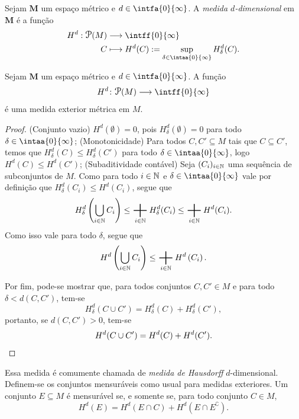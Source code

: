 \begin{defi}
Sejam $\bm M$ um espaço métrico e $d \in \intfa{0}{\infty}$. A \emph{medida $d$-dimensional} em $\bm M$ é a função
 	\begin{align*}
 	\func{H^d}{\p(M)}{\intff{0}{\infty}}{C}{H^d(C) := \sup_{\delta \in \intaa{0}{\infty}} H^d_\delta(C).}
 	\end{align*}
\end{defi}

\begin{prop}
Sejam $\bm M$ um espaço métrico e $d \in \intfa{0}{\infty}$. A função
	\begin{equation*}
	H^d\colon \p(M) \to \intff{0}{\infty}
	\end{equation*}
é uma medida exterior métrica em $M$.
\end{prop}
\begin{proof}
(Conjunto vazio) $H^d(\emptyset)=0$, pois $H^d_\delta(\emptyset)=0$ para todo $\delta \in \intaa{0}{\infty}$; (Monotonicidade) Para todos $C,C' \subseteq M$ tais que $C \subseteq C'$, temos que $H^d_\delta(C) \leq H^d_\delta(C')$ para todo $\delta \in \intaa{0}{\infty}$, logo $H^d(C) \leq H^d(C')$; (Subaditividade contável) Seja $(C_i)_{i \in \mathbb{N}}$ uma sequência de subconjuntos de $M$. Como para todo $i \in \mathbb{N}$ e $\delta \in \intaa{0}{\infty}$ vale por definição que $H^d_\delta(C_i) \leq H^d(C_i)$, segue que
	\begin{equation*}
	H^d_\delta\left( \bigcup_{i \in \N} C_i \right) \leq \sum_{i \in \N} H^d_\delta(C_i) \leq  \sum_{i \in \N} H^d(C_i).
	\end{equation*}
Como isso vale para todo $\delta$, segue que
	\begin{equation*}
	H^d\left( \bigcup_{i \in \N} C_i \right) \leq \sum_{i \in \N} H^d\left( C_i \right).
	\end{equation*}

Por fim, pode-se mostrar que, para todos conjuntos $C,C' \in M$ e para todo $\delta < d(C,C')$, tem-se
	\begin{equation*}
	H^d_\delta(C \cup C') = H^d_\delta(C) + H^d_\delta(C'),
	\end{equation*}
portanto, se $d(C,C') > 0$, tem-se
	\begin{equation*}
	H^d(C \cup C') = H^d(C) + H^d(C'). \qedhere
	\end{equation*}
\end{proof}

Essa medida é comumente chamada de \emph{medida de Hausdorff} $d$-dimensional. Definem-se os conjuntos mensuráveis como usual para medidas exteriores. Um conjunto $E \subseteq M$ é mensurável se, e somente se, para todo conjunto $C \in M$,
	\begin{equation*}
	H^d(E) = H^d(E \cap C) + H^d(E \cap E^\complement).
	\end{equation*}

